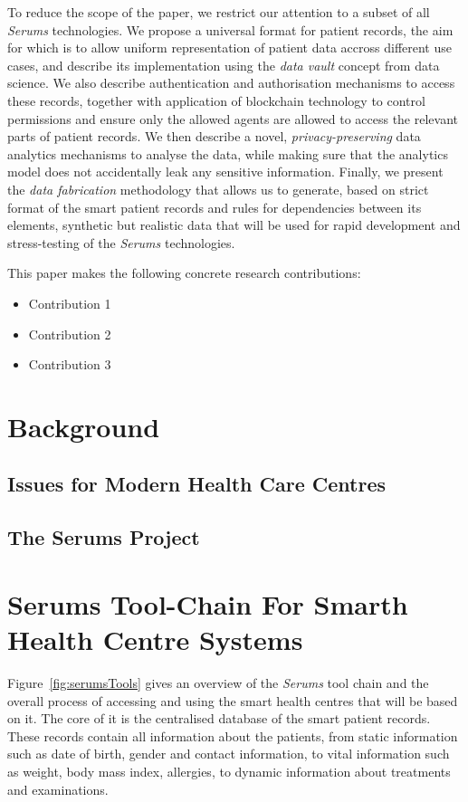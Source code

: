 To reduce the scope of the paper, we restrict our attention to a subset of all \emph{Serums} technologies. We propose a universal format for patient records, the aim for which is to allow uniform representation of patient data accross different use cases, and describe its implementation using the \emph{data vault} concept from data science. We also describe authentication and authorisation mechanisms to access these records, together with application of blockchain technology to control permissions and ensure only the allowed agents are allowed to access the relevant parts of patient records. We then describe a novel, \emph{privacy-preserving} data analytics mechanisms to analyse the data, while making sure that the analytics model does not accidentally leak any sensitive information. Finally, we present the \emph{data fabrication} methodology that allows us to generate, based on strict format of the smart patient records and rules for dependencies between its elements, synthetic but realistic data that will be used for rapid development and stress-testing of the \emph{Serums} technologies.


This paper makes the following concrete research contributions:
\begin{itemize}
\item Contribution 1
\item Contribution 2
\item Contribution 3
\end{itemize}

\section{Background}

\subsection{Issues for Modern Health Care Centres}

\subsection{The Serums Project}


\section{Serums Tool-Chain For Smarth Health Centre Systems}

\noindent Figure~\ref{fig:serumsTools} gives an overview of the \emph{Serums} tool chain and the overall process of accessing and using the smart health centres that will be based on it. The core of it is the centralised database of the smart patient records. These records contain all information about the patients, from static information such as date of birth, gender and contact information, to vital information such as weight, body mass index, allergies, to dynamic information about treatments and examinations. 


